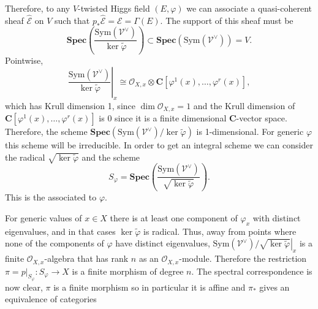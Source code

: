 \documentclass[12pt,a4paper]{book}
\theoremstyle{definition} \newtheorem{defn}[thm]{Definition}
\theoremstyle{definition} \newtheorem{ejemplo}[thm]{Example}
\theoremstyle{remark} \newtheorem{rem}[thm]{Remark}
\def\OO{\mathscr{O}}
\def\VV{\mathscr{V}}
\def\EE{\mathscr{E}}
\def\CC{\mathbf{C}}
\def\Sym{\mathrm{Sym}}
\def\RSpec{\mathbf{Spec}}
\let\emph\relax
\begin{document}
  Therefore, to any $V$-twisted Higgs field $(E,\varphi)$ we can associate a quasi-coherent sheaf $\hat{\EE}$ on $V$ such that $p_* \hat{\EE} = \EE = \Gamma(E)$. The support of this sheaf must be
  \begin{equation*}
    \RSpec\left( \frac{\Sym(\VV^\vee)}{\ker \tilde{\varphi}} \right) \subset \RSpec(\Sym(\VV^\vee))=V.
  \end{equation*}
  Pointwise,
  \begin{equation*}
    \left.\frac{\Sym(\VV^\vee)}{\ker \tilde{\varphi}}\right|_x \cong \OO_{X,x} \otimes \CC[\varphi^1(x),\dots,\varphi^r(x)],
  \end{equation*}
  which has Krull dimension 1, since $\dim \OO_{X,x}=1$ and the Krull dimension of $\CC[\varphi^1(x),\dots,\varphi^r(x)]$ is 0 since it is a finite dimensional $\CC$-vector space. Therefore, the scheme $\RSpec\left( \Sym(\VV^\vee)/\ker \tilde{\varphi} \right)$ is  1-dimensional. For generic $\varphi$ this scheme will be irreducible. In order to get an integral scheme we can consider the radical $\sqrt{\ker \tilde{\varphi}}$ and the scheme
  $$S_\varphi=\RSpec\left( \frac{\Sym(\VV^\vee)}{\sqrt{\ker \tilde{\varphi}}} \right).$$
  This is the \emph{spectral curve} associated to $\varphi$.

  For generic values of $x\in X$ there is at least one component of $\varphi_x$ with distinct eigenvalues, and in that cases $\ker \tilde{\varphi}$ is radical. Thus, away from points where none of the components of $\varphi$ have distinct eigenvalues, $\left. \Sym(\VV^\vee)/\sqrt{\ker \tilde{\varphi}}\right|_x$ is a finite $\OO_{X,x}$-algebra that has rank $n$ as an $\OO_{X,x}$-module. Therefore the restriction $\pi=p|_{S_\varphi}: S_\varphi \rightarrow X$ is a finite morphism of degree $n$. The spectral correspondence is now clear, $\pi$ is a finite morphism so in particular it is affine and $\pi_*$ gives an equivalence of categories
  \begin{center}
  \end{center}
\end{document}
